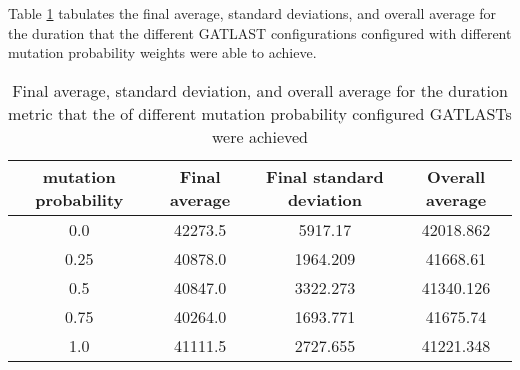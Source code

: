 Table \ref{tab:HP:GA:mutationProp:duration} tabulates the final average, standard deviations, and overall average for the duration that the different GATLAST configurations configured with different mutation probability weights were able to achieve.
\begin{table}[tbh!]
\centering
\begin{adjustbox}{trim=0cm 0cm 0cm 0cm, clip=true}
\begin{tabular}{|c|c|c|c|}
\hline
mutation probability & Final average & Final standard deviation & Overall average\\
\hline
0.0 & 42273.5 & 5917.17 & 42018.862\\\hline
0.25 & 40878.0 & 1964.209 & 41668.61\\\hline
0.5 & 40847.0 & 3322.273 & 41340.126\\\hline
0.75 & 40264.0 & 1693.771 & 41675.74\\\hline
1.0 & 41111.5 & 2727.655 & 41221.348\\\hline
\end{tabular}
\end{adjustbox}
\caption{Final average, standard deviation, and overall average for the duration metric that the of different mutation probability configured GATLASTs were achieved}
\label{tab:HP:GA:mutationProp:duration}
\end{table}